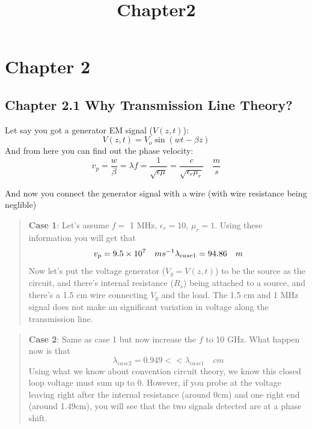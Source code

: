 \documentclass[11pt]{article}
\title{Chapter2}
\def\lt{<}
\begin{document}
    
    \maketitle
    
    

    
    \hypertarget{chapter-2}{%
\section{Chapter 2}\label{chapter-2}}

\hypertarget{chapter-2.1-why-transmission-line-theory}{%
\subsection{Chapter 2.1 Why Transmission Line
Theory?}\label{chapter-2.1-why-transmission-line-theory}}

Let say you got a generator EM signal (\(V(z,t)\)):
\[V(z,t)=V_o\sin{(wt-\beta z)}\] And from here you can find out the
phase velocity:
\[v_p=\frac{w}{\beta}=\lambda f=\frac{1}{\sqrt{\epsilon \mu}}=\frac{c}{\sqrt{\epsilon_r \mu_r}} \quad \frac{m}{s}\]

And now you connect the generator signal with a wire (with wire
resistance being neglible)

    \begin{quote}
\textbf{Case 1}: Let's assume \(f=\) 1 MHz, \(\epsilon_r=10\),
\(\mu_r=1\). Using these information you will get that
\[v_p=9.5\times 10^7 \quad ms^{-1}\\
\lambda_{case1} = 94.86 \quad m \] Now let's put the voltage generator
(\(V_g = V(z,t)\)) to be the source as the circuit, and there's internal
resistance (\(R_s\)) being attached to a source, and there's a 1.5 cm
wire connecting \(V_g\) and the load. The 1.5 cm and 1 MHz signal does
not make an significant variation in voltage along the transmission
line.
\end{quote}

\begin{quote}
\textbf{Case 2}: Same as case 1 but now increase the \(f\) to 10 GHz.
What happen now is that
\[\lambda_{case2} = 0.949 \lt\lt \lambda_{case1} \quad cm\] Using what
we know about convention circuit theory, we know this closed loop
voltage must sum up to 0. However, if you probe at the voltage leaving
right after the internal resistance (around 0cm) and one right end
(around 1.49cm), you will see that the two signals detected are at a
phase shift.
\end{quote}
\end{document}
